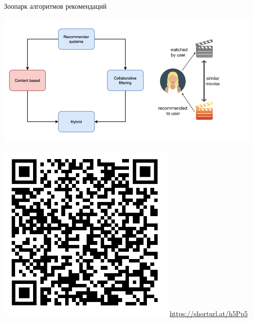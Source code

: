 \documentclass[11pt,aspectratio=169]{beamer}
\begin{document}
\begin{frame}{Зоопарк алгоритмов рекомендаций \cite{ali_2021}}

\begin{center}
\includegraphics[scale=0.27]{images/taxonomy-2.png}
\end{center}

\includegraphics[scale=0.3]{images/poll.png} \hfill \url{https://shorturl.at/h5Pp5}

\end{frame}
\end{document}
